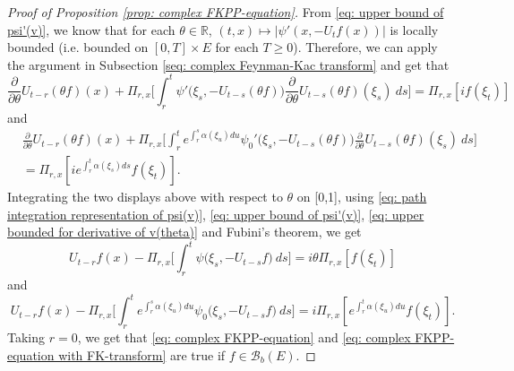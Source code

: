 \documentclass[12pt,a4paper]{amsart}
\theoremstyle{plain}
\theoremstyle{definition}
\numberwithin{equation}{section}
\begin{document}
\begin{proof}[Proof of Proposition \ref{prop: complex FKPP-equation}]
    From \eqref{eq: upper bound of psi'(v)}, we know that for each $\theta\in \mathbb R$, $(t,x) \mapsto |\psi'(x,-U_tf(x))|$ is locally bounded (i.e. bounded on $[0,T]\times E$ for each $T \geq 0$).
    Therefore, we can apply the argument in Subsection \ref{seq: complex Feynman-Kac transform} and get that
\[
    \frac{\partial}{\partial \theta} U_{t-r}(\theta f)(x) + \Pi_{r,x} \Big[\int_r^t \psi'\big(\xi_s,- U_{t-s}(\theta f)\big)\frac{\partial}{\partial \theta} U_{t-s}(\theta f)(\xi_s)~ds\Big]
    = \Pi_{r,x} [i f(\xi_t)]
\]
    and
\begin{equation}\begin{split}
    &\frac{\partial}{\partial \theta} U_{t-r}(\theta f)(x) + \Pi_{r,x} \Big[\int_r^t e^{\int_r^s \alpha(\xi_u)du}\psi_0'\big(\xi_s,- U_{t-s}(\theta f)\big)\frac{\partial}{\partial \theta} U_{t-s}(\theta f)(\xi_s)~ds\Big]\\
    &= \Pi_{r,x} [i e^{\int_r^t \alpha(\xi_s)ds}f(\xi_t)].
\end{split}\end{equation}
    Integrating the two displays above with respect to $\theta$  on [0,1], using \eqref{eq: path integration representation of psi(v)}, \eqref{eq: upper bound of psi'(v)}, \eqref{eq: upper bounded for derivative of v(theta)} and Fubini's theorem, we get
\begin{equation}
    U_{t-r}f(x) - \Pi_{r,x} \Big[\int_r^t \psi\big(\xi_s,-U_{t-s}f\big) ~ds\Big]
    = i\theta \Pi_{r,x} [f(\xi_t)]
\end{equation}
    and
\begin{equation}
    U_{t-r}f(x) - \Pi_{r,x} \Big[\int_r^t e^{\int_r^s \alpha(\xi_u)du} \psi_0\big(\xi_s,- U_{t-s}f\big) ~ds\Big]
    = i\Pi_{r,x} [e^{\int_r^t\alpha(\xi_u)du}f(\xi_t)].
\end{equation}
    Taking $r = 0$, we get that \eqref{eq: complex FKPP-equation} and \eqref{eq: complex FKPP-equation with FK-transform} are true if $f\in \mathcal B_b(E)$.


\end{proof}
\end{document}
